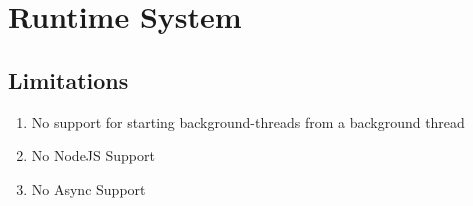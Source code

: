 \section{Runtime System}\label{sec:runtime-system}

\subsection{Limitations}
\begin{enumerate}
	\item No support for starting background-threads from a background thread
	\item No NodeJS Support
	\item No Async Support
\end{enumerate}